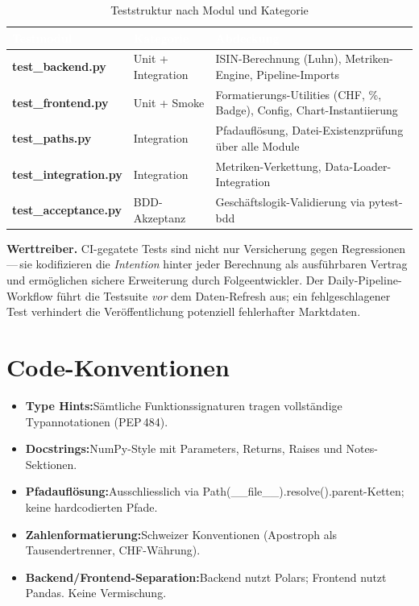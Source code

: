\documentclass[11pt, a4paper, oneside, openany]{report}
\newcommand{\code}[1]{{\codefont\small\textcolor{DeepNavy}{#1}}}
\begin{document}
\begin{table}[H]
\centering
\caption{Teststruktur nach Modul und Kategorie}
\label{tab:tests}
\sffamily\small
\begin{tabularx}{\textwidth}{>{\ttfamily\bfseries}p{3.5cm} l X}
  \toprule
  \rowcolor{DeepNavy} \textcolor{white}{\textbf{Testmodul}} & \textcolor{white}{\textbf{Kategorie}} & \textcolor{white}{\textbf{Abdeckung}} \\
  \midrule
  test\_backend.py     & Unit + Integration   & ISIN-Berechnung (Luhn), Metriken-Engine, Pipeline-Imports \\
  test\_frontend.py    & Unit + Smoke         & Formatierungs-Utilities (CHF, \%, Badge), Config, Chart-Instantiierung \\
  test\_paths.py       & Integration          & Pfadauflösung, Datei-Existenzprüfung über alle Module \\
  test\_integration.py & Integration          & Metriken-Verkettung, Data-Loader-Integration \\
  test\_acceptance.py  & BDD-Akzeptanz        & Geschäftslogik-Validierung via pytest-bdd \\
  \bottomrule
\end{tabularx}
\end{table}

\begin{insightbox}
\textbf{Werttreiber.} CI-gegatete Tests sind nicht nur Versicherung gegen Regressionen\,---\,sie kodifizieren die \emph{Intention} hinter jeder Berechnung als ausführbaren Vertrag und ermöglichen sichere Erweiterung durch Folgeentwickler. Der Daily-Pipeline-Workflow führt die Testsuite \emph{vor} dem Daten-Refresh aus; ein fehlgeschlagener Test verhindert die Veröffentlichung potenziell fehlerhafter Marktdaten.
\end{insightbox}

\section{Code-Konventionen}

\begin{itemize}
  \item \textbf{Type Hints:}\;Sämtliche Funktionssignaturen tragen vollständige Typannotationen (PEP\,484).
  \item \textbf{Docstrings:}\;NumPy-Style mit \code{Parameters}, \code{Returns}, \code{Raises} und \code{Notes}-Sektionen.
  \item \textbf{Pfadauflösung:}\;Ausschliesslich via \code{Path(\_\_file\_\_).resolve().parent}-Ketten; keine hardcodierten Pfade.
  \item \textbf{Zahlenformatierung:}\;Schweizer Konventionen (Apostroph als Tausendertrenner, CHF-Währung).
  \item \textbf{Backend/Frontend-Separation:}\;Backend nutzt Polars; Frontend nutzt Pandas. Keine Vermischung.
\end{itemize}
\end{document}

